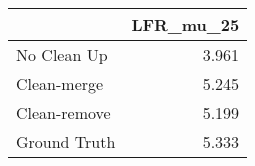 \begin{tabular}{lr}
\toprule
{} & LFR_mu_25 \\
\midrule
No Clean Up  &     3.961 \\
Clean-merge  &     5.245 \\
Clean-remove &     5.199 \\
Ground Truth &     5.333 \\
\bottomrule
\end{tabular}
